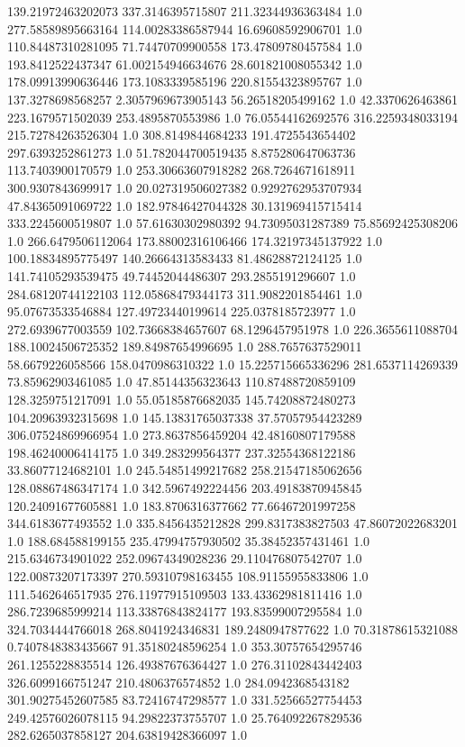 139.21972463202073	337.3146395715807	211.32344936363484	1.0
277.58589895663164	114.00283386587944	16.69608592906701	1.0
110.84487310281095	71.74470709900558	173.47809780457584	1.0
193.8412522437347	61.002154946634676	28.601821008055342	1.0
178.09913990636446	173.1083339585196	220.81554323895767	1.0
137.3278698568257	2.3057969673905143	56.26518205499162	1.0
42.3370626463861	223.1679571502039	253.4895870553986	1.0
76.05544162692576	316.2259348033194	215.72784263526304	1.0
308.8149844684233	191.4725543654402	297.6393252861273	1.0
51.782044700519435	8.875280647063736	113.7403900170579	1.0
253.30663607918282	268.7264671618911	300.9307843699917	1.0
20.027319506027382	0.9292762953707934	47.84365091069722	1.0
182.97846427044328	30.131969415715414	333.2245600519807	1.0
57.61630302980392	94.73095031287389	75.85692425308206	1.0
266.6479506112064	173.88002316106466	174.32197345137922	1.0
100.18834895775497	140.26664313583433	81.48628872124125	1.0
141.74105293539475	49.74452044486307	293.2855191296607	1.0
284.68120744122103	112.05868479344173	311.9082201854461	1.0
95.07673533546884	127.49723440199614	225.0378185723977	1.0
272.6939677003559	102.73668384657607	68.1296457951978	1.0
226.3655611088704	188.10024506725352	189.84987654996695	1.0
288.7657637529011	58.6679226058566	158.0470986310322	1.0
15.225715665336296	281.6537114269339	73.85962903461085	1.0
47.85144356323643	110.87488720859109	128.3259751217091	1.0
55.05185876682035	145.74208872480273	104.20963932315698	1.0
145.13831765037338	37.57057954423289	306.07524869966954	1.0
273.8637856459204	42.48160807179588	198.46240006414175	1.0
349.283299564377	237.32554368122186	33.86077124682101	1.0
245.54851499217682	258.21547185062656	128.08867486347174	1.0
342.5967492224456	203.49183870945845	120.24091677605881	1.0
183.8706316377662	77.66467201997258	344.6183677493552	1.0
335.8456435212828	299.8317383827503	47.86072022683201	1.0
188.684588199155	235.47994757930502	35.38452357431461	1.0
215.6346734901022	252.09674349028236	29.110476807542707	1.0
122.00873207173397	270.59310798163455	108.91155955833806	1.0
111.5462646517935	276.11977915109503	133.43362981811416	1.0
286.7239685999214	113.33876843824177	193.83599007295584	1.0
324.7034444766018	268.8041924346831	189.2480947877622	1.0
70.31878615321088	0.7407848383435667	91.35180248596254	1.0
353.30757654295746	261.1255228835514	126.49387676364427	1.0
276.31102843442403	326.6099166751247	210.4806376574852	1.0
284.0942368543182	301.90275452607585	83.72416747298577	1.0
331.52566527754453	249.42576026078115	94.29822373755707	1.0
25.764092267829536	282.6265037858127	204.63819428366097	1.0
